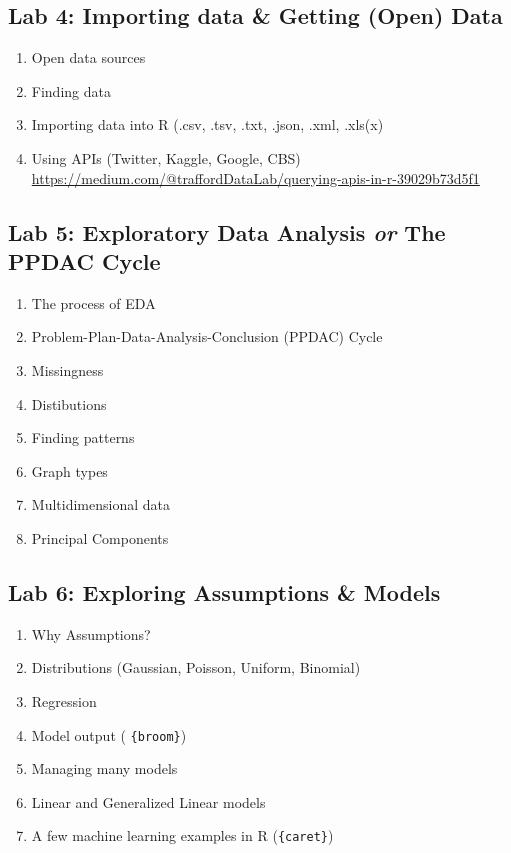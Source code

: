 \documentclass[]{book}
\providecommand{\tightlist}{%
  \setlength{\itemsep}{0pt}\setlength{\parskip}{0pt}}
\begin{document}
\hypertarget{lab-4-importing-data-getting-open-data}{%
\subsection{Lab 4: Importing data \& Getting (Open) Data}\label{lab-4-importing-data-getting-open-data}}

\begin{enumerate}
\def\labelenumi{\arabic{enumi}.}
\tightlist
\item
  Open data sources
\item
  Finding data
\item
  Importing data into R (.csv, .tsv, .txt, .json, .xml, .xls(x)
\item
  Using APIs (Twitter, Kaggle, Google, CBS)
  \url{https://medium.com/@traffordDataLab/querying-apis-in-r-39029b73d5f1}
\end{enumerate}

\hypertarget{lab-5-exploratory-data-analysis-or-the-ppdac-cycle}{%
\subsection{\texorpdfstring{Lab 5: Exploratory Data Analysis \emph{or} The PPDAC Cycle}{Lab 5: Exploratory Data Analysis or The PPDAC Cycle}}\label{lab-5-exploratory-data-analysis-or-the-ppdac-cycle}}

\begin{enumerate}
\def\labelenumi{\arabic{enumi}.}
\tightlist
\item
  The process of EDA
\item
  Problem-Plan-Data-Analysis-Conclusion (PPDAC) Cycle
\item
  Missingness
\item
  Distibutions
\item
  Finding patterns
\item
  Graph types
\item
  Multidimensional data
\item
  Principal Components
\end{enumerate}

\hypertarget{lab-6-exploring-assumptions-models}{%
\subsection{Lab 6: Exploring Assumptions \& Models}\label{lab-6-exploring-assumptions-models}}

\begin{enumerate}
\def\labelenumi{\arabic{enumi}.}
\tightlist
\item
  Why Assumptions?
\item
  Distributions (Gaussian, Poisson, Uniform, Binomial)
\item
  Regression
\item
  Model output ( \texttt{\{broom\}})
\item
  Managing many models
\item
  Linear and Generalized Linear models
\item
  A few machine learning examples in R (\texttt{\{caret\}})
\end{enumerate}
\end{document}
